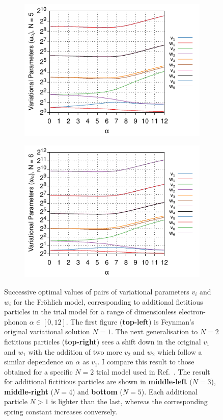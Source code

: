 \begin{figure}[!tbp]
\begin{subfigure}[b]{0.49\textwidth}
    \includegraphics[width=\textwidth]{figures/frohlich-3d-multivariate-vw-alpha-0to12-beta-inf-N-5-COLOUR.pdf}
  \end{subfigure}
  \begin{subfigure}[b]{0.49\textwidth}
    \centering
    \includegraphics[width=\textwidth]{figures/frohlich-3d-multivariate-vw-alpha-0to12-beta-inf-N-6-COLOUR.pdf}
  \end{subfigure}
  \caption{Successive optimal values of pairs of variational parameters $v_i$ and $w_i$ for the Fr\"ohlich model, corresponding to additional fictitious particles in the trial model for a range of dimensionless electron-phonon $\alpha \in [0, 12]$. The first figure (\textbf{top-left}) is Feynman's original variational solution $N=1$. The next generalisation to $N=2$ fictitious particles (\textbf{top-right}) sees a shift down in the original $v_1$ and $w_1$ with the addition of two more $v_2$ and $w_2$ which follow a similar dependence on $\alpha$ as $v_1$. I compare this result to those obtained for a specific $N=2$ trial model used in Ref.~\cite{abe_improvement_1971}. The result for additional fictitious particles are shown in \textbf{middle-left} ($N=3$), \textbf{middle-right} ($N=4$) and \textbf{bottom} ($N=5$). Each additional particle $N>1$ is lighter than the last, whereas the corresponding spring constant increases conversely.}

\end{figure}
